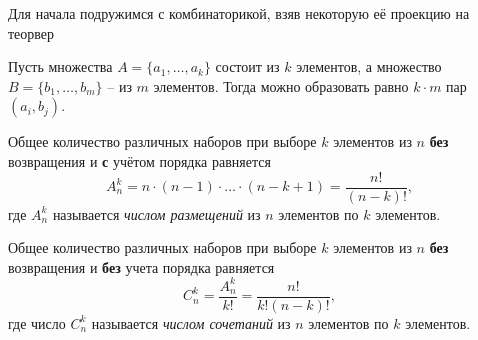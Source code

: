 Для начала подружимся с комбинаторикой, взяв некоторую её проекцию на теорвер

\begin{to_thr}[]
    Пусть множества $A = \{a_1, \ldots, a_k\}$ состоит из $k$ элементов, а множество $B = \{b_1, \ldots, b_m\}$ -- из $m$ элементов. Тогда можно образовать равно $k\cdot m$ пар $(a_i, b_j)$.
\end{to_thr}

\begin{to_thr}[]
    Общее количество различных наборов при выборе $k$ элементов из $n$ \textbf{без} возвращения и \textbf{с} учётом порядка равняется
    \begin{equation*}
        A_n^k = n \cdot (n-1) \cdot \ldots \cdot (n-k+1) = \frac{n!}{(n-k)!},
    \end{equation*}
    где $A_n^k$ называется \textit{числом размещений} из $n$ элементов по $k$ элементов. 
\end{to_thr}

\begin{to_thr}[]
    Общее количество различных наборов при выборе $k$ элементов из $n$ \textbf{без} возвращения и \textbf{без} учета порядка равняется
    \begin{equation*}
        C_n^k = \frac{A_n^k}{k!} = \frac{n!}{k! (n-k)!},
    \end{equation*}
    где число $C_n^k$ называется \textit{числом сочетаний} из $n$ элементов по $k$ элементов. 
\end{to_thr}

